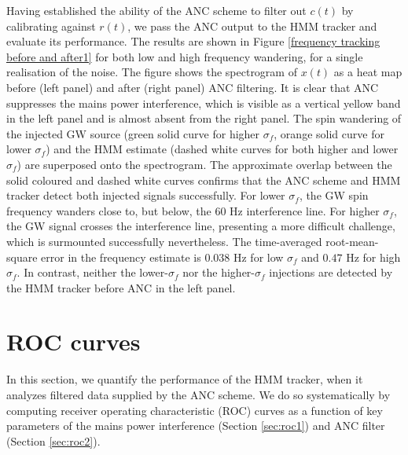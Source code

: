 \documentclass[pra,superscriptaddress,reprint,amsmath,amssymb,nofootinbib]{revtex4-2}
\begin{document}
Having established the ability of the ANC scheme to filter out $c(t)$ by calibrating against $r(t)$, we pass the ANC output to the HMM tracker and evaluate its performance. The results are shown in  Figure \ref{frequency tracking before and after1} for both low and high frequency wandering, for a single realisation of the noise. The figure shows the spectrogram of $x(t)$ as a heat map before (left panel) and after (right panel) ANC filtering. It is clear that ANC suppresses the mains power interference, which is visible as a vertical yellow band in the left panel and is almost absent from the right panel. The spin wandering of the injected GW source (green solid curve for higher $\sigma_f$, orange solid curve for lower $\sigma_f$) and the HMM estimate (dashed white curves for both higher and lower $\sigma_f$) are superposed onto the spectrogram. The approximate overlap between the solid coloured and dashed white curves confirms that the ANC scheme and HMM tracker detect both injected signals successfully. For lower $\sigma_f$, the GW spin frequency wanders close to, but below, the 60 Hz interference line. For higher $\sigma_f$, the GW signal crosses the interference line, presenting a more difficult challenge, which is surmounted successfully nevertheless. The time-averaged root-mean-square error in the frequency estimate is $0.038$ Hz for low $\sigma_f $ and $0.47$ Hz for high $\sigma_f$. In contrast, neither the lower-$\sigma_f$ nor the higher-$\sigma_f$ injections are detected by the HMM tracker before ANC in the left panel. 



\section{ROC curves}\label{sec:theroccurves}



In this section, we quantify the performance of the HMM tracker, when it analyzes filtered data supplied by the ANC scheme. We do so systematically by computing receiver operating characteristic (ROC) curves as a function of key parameters of the mains power interference (Section \ref{sec:roc1}) and ANC filter (Section \ref{sec:roc2}).
\end{document}

